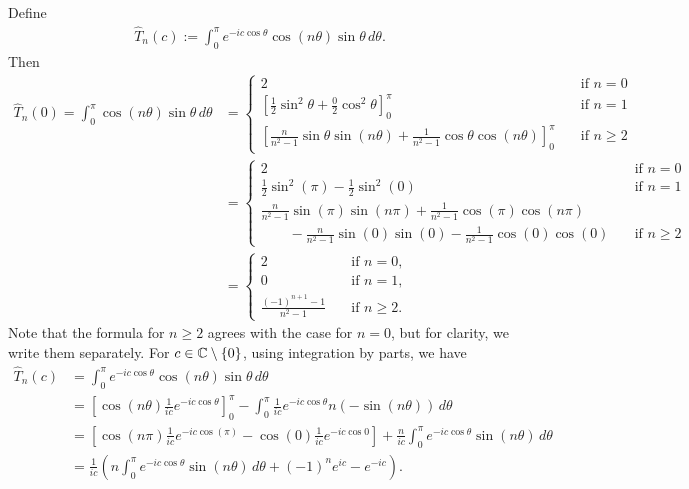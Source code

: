 \documentclass[12pt, oneside, a4paper]{article}
\begin{document}
Define
\begin{align*}
    \hat{T}_n(c) := \int_0^\pi e^{-ic\cos\theta} \cos(n\theta) \sin\theta\,d\theta.
\end{align*}
Then 
\begin{align*}
    \hat{T}_n(0) = \int_0^{\pi}\cos(n\theta)\sin\theta\,d\theta &=
    \begin{cases}
    2&\quad\mbox{if $n=0$}\\
    [\frac{1}{2}\sin^2\theta + \frac{0}{2}\cos^2\theta]_0^{\pi}&\quad\mbox{if $n=1$}\\
    \left[\frac{n}{n^2-1}\sin\theta\sin(n\theta) + \frac{1}{n^2-1}\cos\theta\cos(n\theta)\right]_0^{\pi}&\quad\mbox{if $n\geq 2$}
    \end{cases}\\
    &= 
    \begin{cases}
    2&\quad\mbox{if $n=0$}\\
    \frac{1}{2}\sin^2(\pi) - \frac{1}{2}\sin^2(0)&\quad\mbox{if $n=1$}\\
    \frac{n}{n^2-1}\sin(\pi)\sin(n\pi) + \frac{1}{n^2-1}\cos(\pi)\cos(n\pi)\\ 
    \qquad - \frac{n}{n^2-1}\sin(0)\sin(0) - \frac{1}{n^2-1}\cos(0)\cos(0)&\quad\mbox{if $n\geq 2$}
    \end{cases}\\
    &= 
    \begin{cases}
    2&\quad\mbox{if $n=0$},\\
    0&\quad\mbox{if $n=1$},\\
    \frac{(-1)^{n+1}-1}{n^2-1}&\quad\mbox{if $n\geq 2$}.
    \end{cases}
\end{align*}
Note that the formula for $n\geq 2$ agrees with the case for $n=0$, but for clarity, we write them separately.
For $c\in\mathbb C\setminus\{0\}$, using integration by parts, we have
\begin{align*}
    \hat{T}_n(c) &= \int_0^\pi e^{-ic\cos\theta}\cos(n\theta)\sin\theta\,d\theta\\
    &= \left[\cos(n\theta)\frac{1}{ic}e^{-ic\cos\theta}\right]_0^{\pi} - \int_0^{\pi}\frac{1}{ic}e^{-ic\cos\theta}n(-\sin(n\theta))\,d\theta\\
    &= \left[\cos(n\pi)\frac{1}{ic}e^{-ic\cos(\pi)} - \cos(0)\frac{1}{ic}e^{-ic\cos 0}\right] + \frac{n}{ic}\int_0^{\pi}e^{-ic\cos\theta}\sin(n\theta)\,d\theta\\
    &= \frac{1}{ic}\left(n\int_0^{\pi}e^{-ic\cos\theta}\sin(n\theta)\,d\theta + (-1)^n e^{ic}- e^{-ic}\right).
\end{align*}
\end{document}
